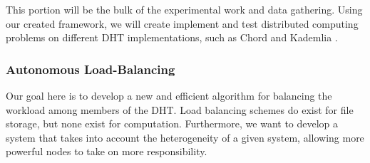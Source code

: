 This portion will be the bulk of the experimental work and data gathering.
Using our created framework, we will create implement and test distributed computing problems on different DHT implementations, such as Chord \cite{chord} and Kademlia \cite{kademlia}.

\subsubsection{Autonomous Load-Balancing}
Our goal here is to develop a new and efficient algorithm for balancing the workload among members of the DHT.
Load balancing schemes do exist for file storage, but none exist for computation.
Furthermore, we want to develop a system that takes into account the heterogeneity of a given system, allowing more powerful nodes to take on more responsibility.









